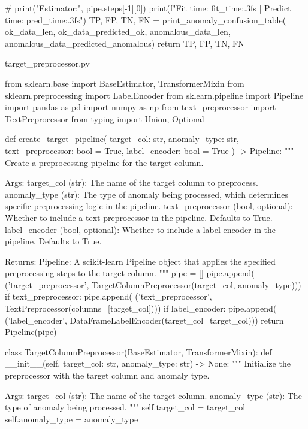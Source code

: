 {{    # print("Estimator:", pipe.steps[-1][0])
    print(f"Fit time: {fit_time:.3f}s | Predict time: {pred_time:.3f}s")
    TP, FP, TN, FN = print_anomaly_confusion_table(
        ok_data_len, ok_data_predicted_ok, anomalous_data_len, anomalous_data_predicted_anomalous)
    return TP, FP, TN, FN

\endtt

\sec target_preprocessor.py

\begtt {}
from sklearn.base import BaseEstimator, TransformerMixin
from sklearn.preprocessing import LabelEncoder
from sklearn.pipeline import Pipeline
import pandas as pd
import numpy as np
from text_preprocessor import TextPreprocessor
from typing import Union, Optional


def create_target_pipeline(
    target_col: str,
    anomaly_type: str,
    text_preprocessor: bool = True,
    label_encoder: bool = True
) -> Pipeline:
    """
    Create a preprocessing pipeline for the target column.

    Args:
        target_col (str): The name of the target column to preprocess.
        anomaly_type (str): The type of anomaly being processed, which determines 
                            specific preprocessing logic in the pipeline.
        text_preprocessor (bool, optional): Whether to include a text preprocessor 
                                            in the pipeline. Defaults to True.
        label_encoder (bool, optional): Whether to include a label encoder in the 
                                        pipeline. Defaults to True.

    Returns:
        Pipeline: A scikit-learn Pipeline object that applies the specified 
                  preprocessing steps to the target column.
    """
    pipe = []
    pipe.append(
        ('target_preprocessor', TargetColumnPreprocessor(target_col, anomaly_type)))
    if text_preprocessor:
        pipe.append(
            ('text_preprocessor', TextPreprocessor(columns=[target_col])))
    if label_encoder:
        pipe.append(
            ('label_encoder', DataFrameLabelEncoder(target_col=target_col)))
    return Pipeline(pipe)


class TargetColumnPreprocessor(BaseEstimator, TransformerMixin):
    def __init__(self, target_col: str, anomaly_type: str) -> None:
        """
        Initialize the preprocessor with the target column and anomaly type.

        Args:
            target_col (str): The name of the target column.
            anomaly_type (str): The type of anomaly being processed.
        """
        self.target_col = target_col
        self.anomaly_type = anomaly_type

}}
